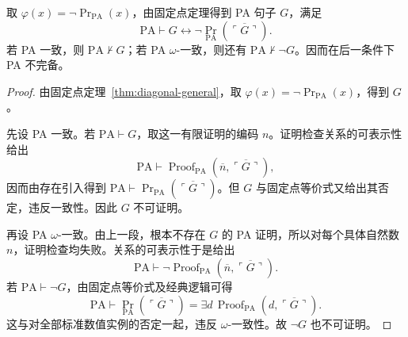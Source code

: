 \documentclass[lang=cn,a4paper,fontset=none,zihao=false,10pt,openany,twoside]{beautybook}
\numberwithin{algorithm}{chapter}
\begin{document}
\begin{theorem}\label{thm:godel-first}
取 $\varphi(x)=\neg\operatorname{Pr}_{\mathrm{PA}}(x)$，由固定点定理得到 PA 句子 $G$，满足
\[
 \mathrm{PA}\vdash G\leftrightarrow
 \neg\operatorname{Pr}_{\mathrm{PA}}(\overline{\ulcorner G\urcorner}).
\]
若 PA 一致，则 $\mathrm{PA}\nvdash G$；若 PA $\omega$-一致，则还有 $\mathrm{PA}\nvdash\neg G$。因而在后一条件下 PA 不完备。
\end{theorem}
\begin{proof}
由固定点定理~\ref{thm:diagonal-general}，取 $\varphi(x)=\neg\operatorname{Pr}_{\mathrm{PA}}(x)$，得到 $G$。

先设 PA 一致。若 $\mathrm{PA}\vdash G$，取这一有限证明的编码 $n$。证明检查关系的可表示性给出
\[
 \mathrm{PA}\vdash
 \operatorname{Proof}_{\mathrm{PA}}(\overline n,\overline{\ulcorner G\urcorner}),
\]
因而由存在引入得到 $\mathrm{PA}\vdash\operatorname{Pr}_{\mathrm{PA}}(\overline{\ulcorner G\urcorner})$。但 $G$ 与固定点等价式又给出其否定，违反一致性。因此 $G$ 不可证明。

再设 PA $\omega$-一致。由上一段，根本不存在 $G$ 的 PA 证明，所以对每个具体自然数 $n$，证明检查均失败。关系的可表示性于是给出
\[
 \mathrm{PA}\vdash
 \neg\operatorname{Proof}_{\mathrm{PA}}(\overline n,\overline{\ulcorner G\urcorner}).
\]
若 $\mathrm{PA}\vdash\neg G$，由固定点等价式及经典逻辑可得
\[
 \mathrm{PA}\vdash\operatorname{Pr}_{\mathrm{PA}}(\overline{\ulcorner G\urcorner})
 =\exists d\,\operatorname{Proof}_{\mathrm{PA}}(d,\overline{\ulcorner G\urcorner}).
\]
这与对全部标准数值实例的否定一起，违反 $\omega$-一致性。故 $\neg G$ 也不可证明。
\end{proof}
\end{document}
